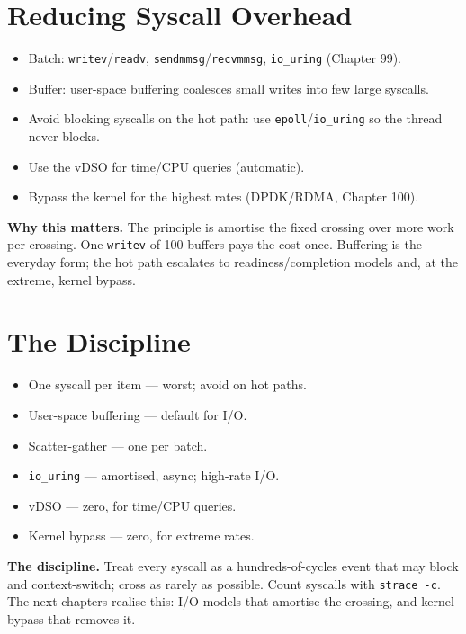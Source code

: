 \section{Reducing Syscall Overhead}
\begin{itemize}
\item Batch: \texttt{writev}/\texttt{readv}, \texttt{sendmmsg}/\texttt{recvmmsg}, \texttt{io\_uring} (Chapter 99).
\item Buffer: user-space buffering coalesces small writes into few large syscalls.
\item Avoid blocking syscalls on the hot path: use \texttt{epoll}/\texttt{io\_uring} so the thread never blocks.
\item Use the vDSO for time/CPU queries (automatic).
\item Bypass the kernel for the highest rates (DPDK/RDMA, Chapter 100).
\end{itemize}

\textbf{Why this matters.} The principle is amortise the fixed crossing over more work per crossing. One \texttt{writev} of 100 buffers pays the cost once. Buffering is the everyday form; the hot path escalates to readiness/completion models and, at the extreme, kernel bypass.

\section{The Discipline}
\begin{itemize}
\item One syscall per item --- worst; avoid on hot paths.
\item User-space buffering --- default for I/O.
\item Scatter-gather --- one per batch.
\item \texttt{io\_uring} --- amortised, async; high-rate I/O.
\item vDSO --- zero, for time/CPU queries.
\item Kernel bypass --- zero, for extreme rates.
\end{itemize}

\textbf{The discipline.} Treat every syscall as a hundreds-of-cycles event that may block and context-switch; cross as rarely as possible. Count syscalls with \texttt{strace -c}. The next chapters realise this: I/O models that amortise the crossing, and kernel bypass that removes it.
